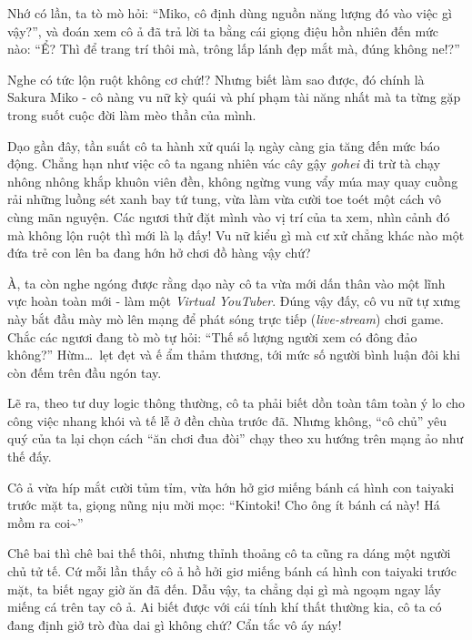 \documentclass[../main.tex]{subfiles}
\begin{document}
Nhớ có lần, ta tò mò hỏi: ``Miko, cô định dùng nguồn năng lượng đó vào việc gì vậy?'', và đoán xem cô ả đã trả lời ta bằng cái giọng điệu hồn nhiên đến mức nào:  ``Ể? Thì để trang trí thôi mà, trông lấp lánh đẹp mắt mà, đúng không ne!?''

Nghe có tức lộn ruột không cơ chứ!? Nhưng biết làm sao được, đó chính là Sakura Miko - cô nàng vu nữ kỳ quái và phí phạm tài năng nhất mà ta từng gặp trong suốt cuộc đời làm mèo thần của mình.

\ct

Dạo gần đây, tần suất cô ta hành xử quái lạ ngày càng gia tăng đến mức báo động. Chẳng hạn như việc cô ta ngang nhiên vác cây gậy \textit{gohei} đi trừ tà chạy nhông nhông khắp khuôn viên đền, không ngừng vung vẩy múa may quay cuồng rải những luồng sét xanh bay tứ tung, vừa làm vừa cười toe toét một cách vô cùng mãn nguyện. Các ngươi thử đặt mình vào vị trí của ta xem, nhìn cảnh đó mà không lộn ruột thì mới là lạ đấy! Vu nữ kiểu gì mà cư xử chẳng khác nào một đứa trẻ con lên ba đang hớn hở chơi đồ hàng vậy chứ?


À, ta còn nghe ngóng được rằng dạo này cô ta vừa mới dấn thân vào một lĩnh vực hoàn toàn mới - làm một \textit{Virtual YouTuber}. Đúng vậy đấy, cô vu nữ tự xưng này bắt đầu mày mò lên mạng để phát sóng trực tiếp (\textit{live-stream}) chơi game. Chắc các ngươi đang tò mò tự hỏi: ``Thế số lượng người xem có đông đảo không?'' Hừm\dots\ lẹt đẹt và ế ẩm thảm thương, tới mức số người bình luận đôi khi còn đếm trên đầu ngón tay.

Lẽ ra, theo tư duy logic thông thường, cô ta phải biết dồn toàn tâm toàn ý lo cho công việc nhang khói và tế lễ ở đền chùa trước đã. Nhưng không, ``cô chủ'' yêu quý của ta lại chọn cách ``ăn chơi đua đòi'' chạy theo xu hướng trên mạng ảo như thế đấy.

Cô ả vừa híp mắt cười tủm tỉm, vừa hớn hở giơ miếng bánh cá hình con taiyaki trước mặt ta, giọng nũng nịu mời mọc: ``Kintoki! Cho ông ít bánh cá này! Há mồm ra coi\~{}''


Chê bai thì chê bai thế thôi, nhưng thỉnh thoảng cô ta cũng ra dáng một người chủ tử tế. Cứ mỗi lần thấy cô ả hồ hởi giơ miếng bánh cá hình con taiyaki trước mặt, ta biết ngay giờ ăn đã đến. Dẫu vậy, ta chẳng dại gì mà ngoạm ngay lấy miếng cá trên tay cô ả. Ai biết được với cái tính khí thất thường kia, cô ta có đang định giở trò đùa dai gì không chứ? Cẩn tắc vô áy náy!
\end{document}
